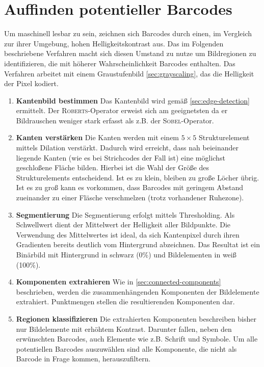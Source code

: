\section{Auffinden potentieller Barcodes}
\writtenby{\dcauthornameewie}%
Um maschinell lesbar zu sein, zeichnen sich Barcodes durch einen, im Vergleich zur ihrer Umgebung, hohen Helligkeitskontrast aus.
Das im Folgenden beschriebene Verfahren macht sich diesen Umstand zu nutze um Bildregionen zu identifizieren, die mit höherer Wahrscheinlichkeit Barcodes enthalten.
Das Verfahren arbeitet mit einem Graustufenbild \autoref{sec:grayscaling}, das die Helligkeit der Pixel kodiert.

\begin{enumerate}[(1)]
\item \textbf{Kantenbild bestimmen}
Das Kantenbild wird gemäß \autoref{sec:edge-detection} ermittelt.
Der \textsc{Roberts}-Operator erweist sich am geeignetsten da er Bildrauschen weniger stark erfasst als z.B. der \textsc{Sobel}-Operator.

\item \textbf{Kanten verstärken}
Die Kanten werden mit einem $5\times5$ Strukturelement mittels Dilation verstärkt.
Dadurch wird erreicht, dass nah beieinander liegende Kanten (wie es bei Strichcodes der Fall ist) eine möglichst geschloßene Fläche bilden.
Hierbei ist die Wahl der Größe des Strukturelements entscheidend.
Ist es zu klein, bleiben zu große Löcher übrig.
Ist es zu groß kann es vorkommen, dass Barcodes mit geringem Abstand zueinander zu einer Fläsche verschmelzen (trotz vorhandener Ruhezone).

\item \textbf{Segmentierung}
Die Segmentierung erfolgt mittels Thresholding.
Als Schwellwert dient der Mittelwert der Helligkeit aller Bildpunkte.
Die Verwendung des Mittelwertes ist ideal, da sich Kantenpixel durch ihren Gradienten bereits deutlich vom Hintergrund abzeichnen.
Das Resultat ist ein Binärbild mit Hintergrund in schwarz (0\%) und Bildelementen in weiß (100\%).

\item \textbf{Komponenten extrahieren}
Wie in \autoref{sec:connected-components} beschrieben, werden die zusammenhängenden Komponenten der Bildelemente extrahiert.
Punktmengen stellen die resultierenden Komponenten dar.

\item \textbf{Regionen klassifizieren}
Die extrahierten Komponenten beschreiben bisher nur Bildelemente mit erhöhtem Kontrast.
Darunter fallen, neben den erwünschten Barcodes, auch Elemente wie z.B. Schrift und Symbole.
Um alle potentiellen Barcodes auszuwählen sind alle Komponente, die nicht als Barcode in Frage kommen, herauszufiltern.


\end{enumerate}
